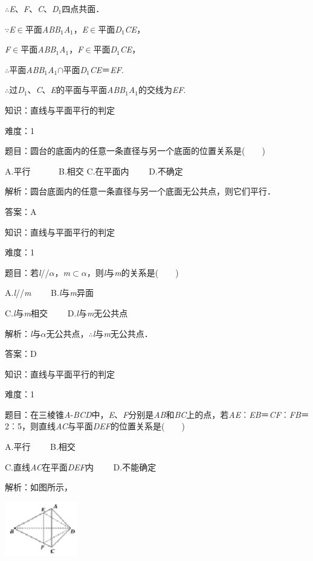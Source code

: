 \documentclass{article} %
\begin{document}
$\mathrm{\therefore}$\textit{E}、\textit{F}、\textit{C}、\textit{D}${}_{1}$四点共面．

$\mathrm{\because}$\textit{E}$\mathrm{\in}$平面\textit{ABB}${}_{1}$\textit{A}${}_{1}$，\textit{E}$\mathrm{\in}$平面\textit{D}${}_{1}$\textit{CE}，

\textit{F}$\mathrm{\in}$平面\textit{ABB}${}_{1}$\textit{A}${}_{1}$，\textit{F}$\mathrm{\in}$平面\textit{D}${}_{1}$\textit{CE}，

$\mathrm{\therefore}$平面\textit{ABB}${}_{1}$\textit{A}${}_{1}$$\mathrm{\cap}$平面\textit{D}${}_{1}$\textit{CE}＝\textit{EF}.

$\mathrm{\therefore}$过\textit{D}${}_{1}$、\textit{C}、\textit{E}的平面与平面\textit{ABB}${}_{1}$\textit{A}${}_{1}$的交线为\textit{EF}.


知识：直线与平面平行的判定

难度：1

题目：圆台的底面内的任意一条直径与另一个底面的位置关系是(　　)

A.平行　　　 B.相交 C.在平面内　　 D.不确定

解析：圆台底面内的任意一条直径与另一个底面无公共点，则它们平行．

答案：A

知识：直线与平面平行的判定

难度：1

题目：若\textit{l}//\textit{$\alpha$}，\textit{m}$\mathrm{\subset }$\textit{$\alpha$}，则\textit{l}与\textit{m}的关系是(　　)

A.\textit{l}//\textit{m}　　  B.\textit{l}与\textit{m}异面 

C.\textit{l}与\textit{m}相交　　  D.\textit{l}与\textit{m}无公共点

解析：\textit{l}与\textit{$\alpha$}无公共点，$\mathrm{\therefore}$\textit{l}与\textit{m}无公共点．

答案：D

知识：直线与平面平行的判定

难度：1

题目：在三棱锥\textit{A}-\textit{BCD}中，\textit{E}、\textit{F}分别是\textit{AB}和\textit{BC}上的点，若\textit{AE}︰\textit{EB}＝\textit{CF}︰\textit{FB}＝2︰5，则直线\textit{AC}与平面\textit{DEF}的位置关系是(　　)

A.平行　　  B.相交

C.直线\textit{AC}在平面\textit{DEF}内　　 D.不能确定

解析：如图所示，

\includegraphics*[width=1.25in, height=0.94in, keepaspectratio=false]{image129}
\end{document}

